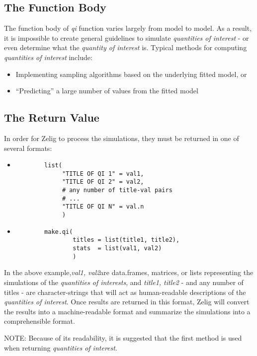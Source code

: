 \documentclass[10pt]{article}
\begin{document}
%
\subsection{The Function Body}
The function body of \emph{qi} function varies largely from model to model.  As a result, it is impossible to create general guidelines to simulate \emph{quantities of interest} - or even determine what the \emph{quantity of interest} is.  Typical methods for computing \emph{quantities of interest} include:
\begin{itemize}
	\item{Implementing sampling algorithms based on the underlying fitted model, or}
	\item{``Predicting'' a large number of values from the fitted model}
\end{itemize}


\subsection{The Return Value}
In order for Zelig to process the simulations, they must be returned in one of several formats:

\begin{itemize}
	\item{\begin{verbatim}
		list(
		     "TITLE OF QI 1" = val1,
		     "TITLE OF QI 2" = val2,
		     # any number of title-val pairs
		     # ...
		     "TITLE OF QI N" = val.n
		     )
	\end{verbatim}}

	\item{\begin{verbatim}
		make.qi(
		        titles = list(title1, title2),
		        stats  = list(val1, val2)
		        )
	\end{verbatim}}
\end{itemize}


In the above example,\emph{val1, val2}are data.frames, matrices, or lists representing the simulations of the \emph{quantities of interests}, and \emph{title1, title2} - and any number of titles - are character-strings that will act as human-readable descriptions of the \emph{quantities of interest}.  Once results are returned in this format, Zelig will convert the results into a machine-readable format and summarize the simulations into a comprehensible format.

NOTE: Because of its readability, it is suggested that the first method is used when returning \emph{quantities of interest}.
\end{document}
